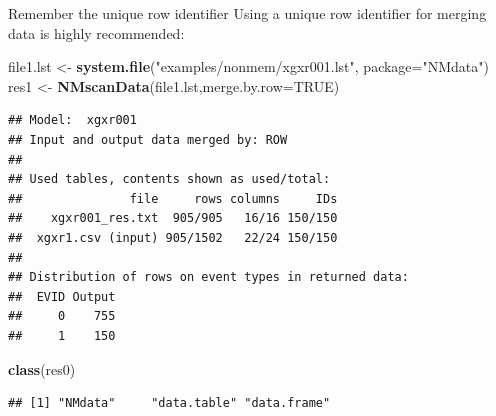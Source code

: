 \documentclass[
  8pt,
  ignorenonframetext,
  aspectratio=169]{beamer}
\newenvironment{Shaded}{\begin{snugshade}}{\end{snugshade}}
\newcommand{\DataTypeTok}[1]{\textcolor[rgb]{0.13,0.29,0.53}{#1}}
\newcommand{\KeywordTok}[1]{\textcolor[rgb]{0.13,0.29,0.53}{\textbf{#1}}}
\newcommand{\NormalTok}[1]{#1}
\newcommand{\OtherTok}[1]{\textcolor[rgb]{0.56,0.35,0.01}{#1}}
\newcommand{\StringTok}[1]{\textcolor[rgb]{0.31,0.60,0.02}{#1}}
\begin{document}
\begin{frame}[fragile]{Remember the unique row identifier}
\protect\hypertarget{remember-the-unique-row-identifier}{}
Using a unique row identifier for merging data is highly recommended:

\footnotesize

\begin{Shaded}
\begin{Highlighting}[]
\NormalTok{file1.lst \textless{}{-}}\StringTok{ }\KeywordTok{system.file}\NormalTok{(}\StringTok{"examples/nonmem/xgxr001.lst"}\NormalTok{, }\DataTypeTok{package=}\StringTok{"NMdata"}\NormalTok{)}
\NormalTok{res1 \textless{}{-}}\StringTok{ }\KeywordTok{NMscanData}\NormalTok{(file1.lst,}\DataTypeTok{merge.by.row=}\OtherTok{TRUE}\NormalTok{)}
\end{Highlighting}
\end{Shaded}

\begin{verbatim}
## Model:  xgxr001 
## Input and output data merged by: ROW 
## 
## Used tables, contents shown as used/total:
##               file     rows columns     IDs
##    xgxr001_res.txt  905/905   16/16 150/150
##  xgxr1.csv (input) 905/1502   22/24 150/150
## 
## Distribution of rows on event types in returned data:
##  EVID Output
##     0    755
##     1    150
\end{verbatim}

\begin{Shaded}
\begin{Highlighting}[]
\KeywordTok{class}\NormalTok{(res0)}
\end{Highlighting}
\end{Shaded}

\begin{verbatim}
## [1] "NMdata"     "data.table" "data.frame"
\end{verbatim}

\normalsize
\end{frame}
\end{document}
